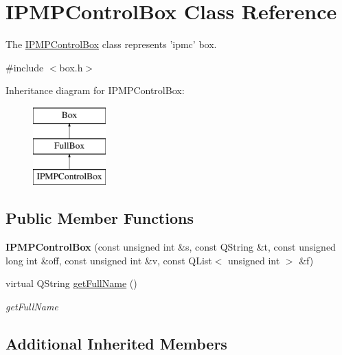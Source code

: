 \hypertarget{class_i_p_m_p_control_box}{\section{I\-P\-M\-P\-Control\-Box Class Reference}
\label{class_i_p_m_p_control_box}
}


The \hyperlink{class_i_p_m_p_control_box}{I\-P\-M\-P\-Control\-Box} class represents 'ipmc' box.  




{\ttfamily \#include $<$box.\-h$>$}

Inheritance diagram for I\-P\-M\-P\-Control\-Box\-:\begin{figure}[H]
\begin{center}
\leavevmode
\includegraphics[height=3.000000cm]{class_i_p_m_p_control_box}
\end{center}
\end{figure}
\subsection*{Public Member Functions}
\begin{DoxyCompactItemize}
\item 
\hypertarget{class_i_p_m_p_control_box_a5f955d3a9632b666ff0fbec92984b886}{{\bfseries I\-P\-M\-P\-Control\-Box} (const unsigned int \&s, const Q\-String \&t, const unsigned long int \&off, const unsigned int \&v, const Q\-List$<$ unsigned int $>$ \&f)}\label{class_i_p_m_p_control_box_a5f955d3a9632b666ff0fbec92984b886}

\item 
virtual Q\-String \hyperlink{class_i_p_m_p_control_box_a5e9c6d323b59faa8d2d43ee2e24a4b33}{get\-Full\-Name} ()
\begin{DoxyCompactList}\small\item\em get\-Full\-Name \end{DoxyCompactList}\end{DoxyCompactItemize}
\subsection*{Additional Inherited Members}


